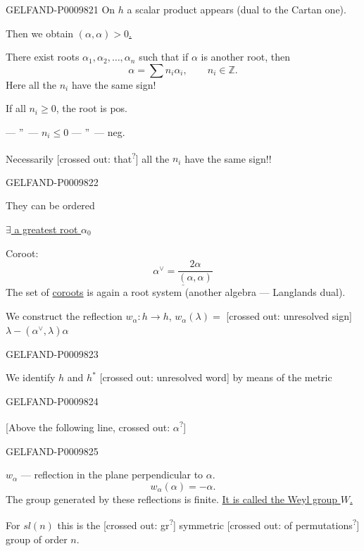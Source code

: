 \begin{GelfandAdjacentEvidence}{GELFAND-P000982}{1}
On $h$ a scalar product appears (dual to the Cartan one).

Then we obtain \underline{$(\alpha,\alpha)>0$.}

There exist roots $\alpha_1,\alpha_2,\ldots,\alpha_n$ such that if $\alpha$ is another root, then
\[
\alpha=\sum n_i\alpha_i,\qquad n_i\in\mathbb Z.
\]
Here all the $n_i$ have the same sign!

If all $n_i\geq0$, the root is pos.

--- \textquotedblright\ --- $n_i\leq0$ --- \textquotedblright\ --- neg.

Necessarily [crossed out: that\textsuperscript{?}] all the $n_i$ have the same sign!!
\end{GelfandAdjacentEvidence}
\begin{GelfandAdjacentEvidence}{GELFAND-P000982}{2}


They can be ordered

\underline{$\exists$ a greatest root $\alpha_0$}

Coroot:
\[
\underline{\alpha^{\vee}=\frac{2\alpha}{(\alpha,\alpha)}}
\]
The set of \underline{coroots} is again a root system (another algebra --- Langlands dual).

We construct the reflection $w_\alpha\colon h\longrightarrow h$,
$w_\alpha(\lambda)=$ [crossed out: unresolved sign]
$\lambda-(\alpha^{\vee},\lambda)\alpha$
\end{GelfandAdjacentEvidence}
\begin{GelfandAdjacentEvidence}{GELFAND-P000982}{3}


We identify $h$ and $h^*$ [crossed out: unresolved word] by means of the metric
\end{GelfandAdjacentEvidence}
\begin{GelfandAdjacentEvidence}{GELFAND-P000982}{4}


[Above the following line, crossed out: $\alpha$\textsuperscript{?}]
\end{GelfandAdjacentEvidence}
\begin{GelfandAdjacentEvidence}{GELFAND-P000982}{5}


$w_\alpha$ --- reflection in the plane perpendicular to $\alpha$.
\[
w_\alpha(\alpha)=-\alpha.
\]
The group generated by these reflections is finite. \underline{It is called the Weyl group $W$.}

For $sl(n)$ this is the [crossed out: gr\textsuperscript{?}] symmetric [crossed out: of permutations\textsuperscript{?}] group of order $n$.
\end{GelfandAdjacentEvidence}
